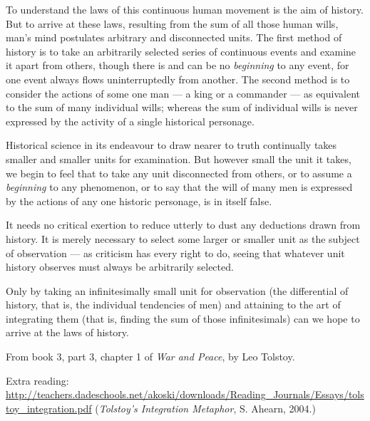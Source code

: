 To understand the laws of this continuous human movement is the aim of history. But to arrive at these laws, resulting from the sum of all those human wills, man's mind postulates arbitrary and disconnected units. The first method of history is to take an arbitrarily selected series of continuous events and examine it apart from others, though there is and can be no \emph{beginning} to any event, for one event always flows uninterruptedly from another. The second method is to consider the actions of some one man --- a king or a commander --- as equivalent to the sum of many individual wills; whereas the sum of individual wills is never expressed by the activity of a single historical personage.

Historical science in its endeavour to draw nearer to truth continually takes smaller and smaller units for examination. But however small the unit it takes, we begin to feel that to take any unit disconnected from others, or to assume a \emph{beginning} to any phenomenon, or to say that the will of many men is expressed by the actions of any one historic personage, is in itself false.

It needs no critical exertion to reduce utterly to dust any deductions drawn from history. It is merely necessary to select some larger or smaller unit as the subject of observation --- as criticism has every right to do, seeing that whatever unit history observes must always be arbitrarily selected.

Only by taking an infinitesimally small unit for observation (the differential of history, that is, the individual tendencies of men) and attaining to the art of integrating them (that is, finding the sum of those infinitesimals) can we hope to arrive at the laws of history.

\begin{flushright}
  From book 3, part 3, chapter 1 of \textit{War and Peace}, by Leo Tolstoy.

  Extra reading: \small{\url{http://teachers.dadeschools.net/akoski/downloads/Reading_Journals/Essays/tolstoy_integration.pdf}}
  (\textit{Tolstoy's Integration Metaphor}, S. Ahearn, 2004.)
\end{flushright}

\clearpage
